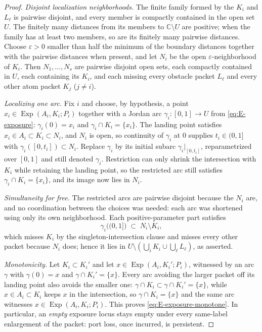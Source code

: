 \documentclass[11pt,reqno]{amsart}
\theoremstyle{definition}
\theoremstyle{remark}
\newcommand{\C}{\mathbb C}
\newcommand{\Exp}{\operatorname{Exp}}
\begin{document}
\begin{proof}
\emph{Disjoint localization neighborhoods.}
The finite family formed by the $K_i$ and $L_\ell$ is pairwise disjoint,
and every member is compactly contained in the open set $U$.  The finitely
many distances from its members to $\C\setminus U$ are positive; when the
family has at least two members, so are its finitely many pairwise
distances.  Choose $\varepsilon>0$ smaller than half the minimum of the
boundary distances together with the pairwise distances when present, and let $N_i$
be the open $\varepsilon$-neighborhood of $K_i$. Then $N_1,\dots,N_s$ are pairwise
disjoint open sets, each compactly contained in $U$, each containing its $K_i$, and
each missing every obstacle packet $L_\ell$ and every other atom packet $K_j$
($j\neq i$).

\emph{Localizing one arc.}
Fix $i$ and choose, by hypothesis, a point $x_i\in\Exp(A_i,K_i;P_i)$ together with a
Jordan arc $\gamma_i\colon[0,1]\to U$ from \eqref{eq:E-exposure}:
$\gamma_i(0)=x_i$ and $\gamma_i\cap K_i=\{x_i\}$. The landing point satisfies
$x_i\in A_i\subset K_i\subset N_i$, and $N_i$ is open, so continuity of $\gamma_i$ at
$0$ supplies $t_i\in(0,1]$ with $\gamma_i([0,t_i])\subset N_i$. Replace $\gamma_i$ by
its initial subarc $\gamma_i|_{[0,t_i]}$, reparametrized over $[0,1]$ and still
denoted $\gamma_i$. Restriction can only shrink the intersection with $K_i$ while
retaining the landing point, so the restricted arc still satisfies
$\gamma_i\cap K_i=\{x_i\}$, and its image now lies in $N_i$.

\emph{Simultaneity for free.}
The restricted arcs are pairwise disjoint because the $N_i$ are, and no coordination
between the choices was needed: each arc was shortened using only its own
neighborhood. Each positive-parameter part satisfies
\[
\gamma_i\bigl((0,1]\bigr)\;\subset\;N_i\setminus K_i,
\]
which misses $K_i$ by the singleton-intersection clause and misses every other packet
because $N_i$ does; hence it lies in
$U\setminus(\bigcup_iK_i\cup\bigcup_\ell L_\ell)$, as asserted.

\emph{Monotonicity.}
Let $K_i\subset K_i'$ and let $x\in\Exp(A_i,K_i';P_i)$, witnessed by an arc $\gamma$
with $\gamma(0)=x$ and $\gamma\cap K_i'=\{x\}$. Every arc avoiding the larger packet
off its landing point also avoids the smaller one: $\gamma\cap K_i\subset
\gamma\cap K_i'=\{x\}$, while $x\in A_i\subset K_i$ keeps $x$ in the intersection, so
$\gamma\cap K_i=\{x\}$ and the same arc witnesses $x\in\Exp(A_i,K_i;P_i)$. This
proves \eqref{eq:E-exposure-monotone}. In particular, an \emph{empty} exposure locus
stays empty under every same-label enlargement of the packet: port loss, once
incurred, is persistent.
\end{proof}
\end{document}
